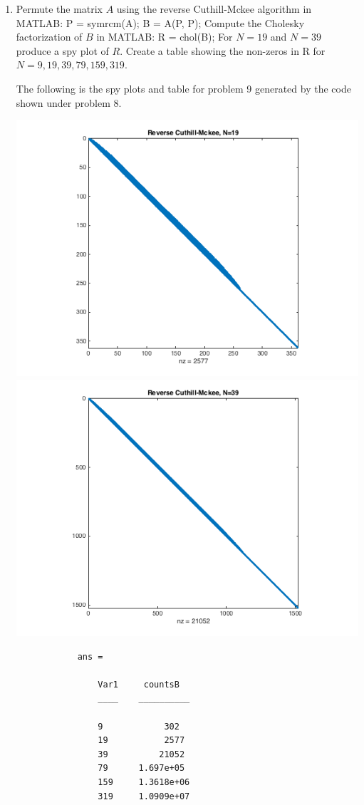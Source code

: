 \documentclass[11pt, oneside, titlepage]{article}
\begin{document}
\begin{enumerate}
    \item %
        Permute the matrix $A$ using the reverse Cuthill-Mckee algorithm in
        MATLAB: P = symrcm(A); B = A(P, P);
        Compute the Cholesky factorization of $B$ in MATLAB: R = chol(B);
        For $N = 19$ and $N = 39$ produce a spy plot of $R$.
        Create a table showing the non-zeros in R for
        $N = 9, 19, 39, 79, 159, 319$.

        The following is the spy plots and table for problem 9 generated by
        the code shown under problem 8.
        \begin{center}
            \includegraphics[scale=.5]{Figures/03_9_1.png}
            \includegraphics[scale=.5]{Figures/03_9_2.png}
        \end{center}
        \begin{verbatim}
            ans = 

                Var1     countsB  
                ____    __________

                9            302
                19           2577
                39          21052
                79      1.697e+05
                159     1.3618e+06
                319     1.0909e+07
        \end{verbatim}
\end{enumerate}
\end{document}
